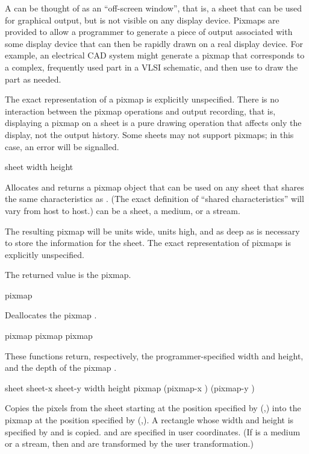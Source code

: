 A  can be thought of as an ``off-screen window'', that is, a
sheet that can be used for graphical output, but is not visible on any display
device.   Pixmaps are provided to allow a programmer to generate a piece of
output associated with some display device that can then be rapidly drawn on a
real display device.  For example, an electrical CAD system might generate a
pixmap that corresponds to a complex, frequently used part in a VLSI schematic,
and then use  to draw the part as needed.

The exact representation of a pixmap is explicitly unspecified.  There is no
interaction between the pixmap operations and output recording, that is,
displaying a pixmap on a sheet is a pure drawing operation that affects only the
display, not the output history.  Some sheets may not support pixmaps; in this
case, an error will be signalled.


 {sheet width height}

Allocates and returns a pixmap object that can be used on any sheet that shares
the same characteristics as .  (The exact definition of ``shared
characteristics'' will vary from host to host.)   can be a sheet, a
medium, or a stream.

The resulting pixmap will be  units wide,  units high,
and as deep as is necessary to store the information for the sheet.  The exact
representation of pixmaps is explicitly unspecified.

The returned value is the pixmap.

 {pixmap}

Deallocates the pixmap .


  {pixmap}
 {pixmap}
  {pixmap}

These functions return, respectively, the programmer-specified width and height,
and the depth of the pixmap .


 {sheet sheet-x sheet-y width height
                              \optional pixmap (pixmap-x ) (pixmap-y )}

Copies the pixels from the sheet  starting at the position specified
by (,) into the pixmap  at the position
specified by (,).  A rectangle whose width and
height is specified by  and  is copied.  
and  are specified in user coordinates.  (If  is a
medium or a stream, then  and  are transformed by the
user transformation.)

